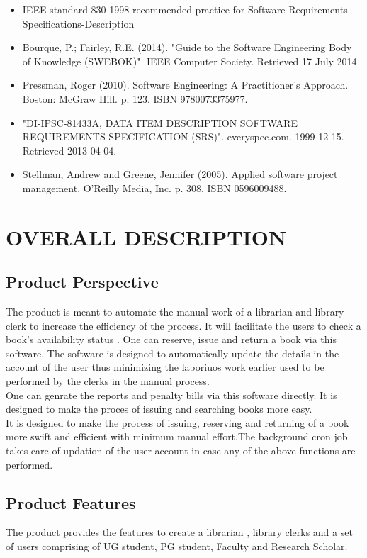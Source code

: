 \documentclass{article}
\begin{document}
\begin{itemize}
\item IEEE standard 830-1998 recommended practice for Software Requirements Specifications-Description
\item Bourque, P.; Fairley, R.E. (2014). "Guide to the Software Engineering Body of Knowledge (SWEBOK)". IEEE Computer Society. Retrieved 17 July 2014.
\item Pressman, Roger (2010). Software Engineering: A Practitioner's Approach. Boston: McGraw Hill. p. 123. ISBN 9780073375977.
\item "DI-IPSC-81433A, DATA ITEM DESCRIPTION SOFTWARE REQUIREMENTS SPECIFICATION (SRS)". everyspec.com. 1999-12-15. Retrieved 2013-04-04.
\item Stellman, Andrew and Greene, Jennifer (2005). Applied software project management. O'Reilly Media, Inc. p. 308. ISBN 0596009488.
\end{itemize}


\section{OVERALL DESCRIPTION}
\subsection{Product Perspective}
The product is meant to automate the manual work of a librarian and library clerk to increase the efficiency of the process. It will facilitate the users to check a book's availability status . One can reserve, issue and return a book via this software. The software is designed to automatically update the details in the account of the user thus minimizing the laboriuos work earlier used to be performed by the clerks in the manual process.
\\
One can genrate the reports and penalty bills via this software directly. It is designed to make the proces of issuing and searching books more easy.
\\
It is designed to make the process of issuing, reserving and returning of a book more swift and efficient with minimum manual effort.The background cron job takes care of updation of the user account in case any of the above functions are performed.

\subsection{Product Features}
The product provides the features to create a librarian , library clerks and a set of users comprising of UG student, PG student, Faculty and Research Scholar.
\end{document}

